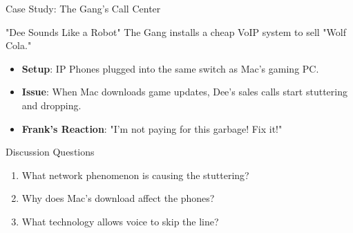 \documentclass[aspectratio=169]{beamer}  %
\begin{document}
\begin{frame}{Case Study: The Gang's Call Center}
    \begin{casestudy}{"Dee Sounds Like a Robot"}
        \small
        The Gang installs a cheap VoIP system to sell "Wolf Cola."
        \begin{itemize}
            \item \textbf{Setup}: IP Phones plugged into the same switch as Mac's gaming PC.
            \item \textbf{Issue}: When Mac downloads game updates, Dee's sales calls start stuttering and dropping.
            \item \textbf{Frank's Reaction}: "I'm not paying for this garbage! Fix it!"
        \end{itemize}
    \end{casestudy}
    
    \begin{block}{Discussion Questions}
        \small
        \begin{enumerate}
            \item What network phenomenon is causing the stuttering?
            \item Why does Mac's download affect the phones?
            \item What technology allows voice to skip the line?
        \end{enumerate}
    \end{block}
\end{frame}
\end{document}
